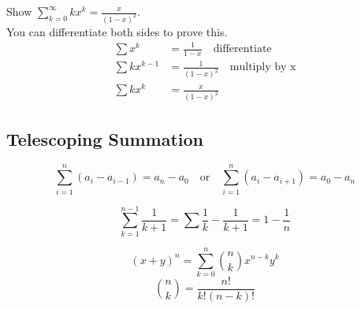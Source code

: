 \begin{example}
    [Summation]
    Show $ \sum_{k=0}^\infty kx^k = \frac{x}{(1-x)^2} $. \\
    You can differentiate both sides to prove this.
    \begin{align*}
        \sum x^k      & = \frac{1}{1-x} \quad \text{differentiate}     \\
        \sum kx^{k-1} & = \frac{1}{(1-x)^2} \quad \text{multiply by x} \\
        \sum kx^k     & = \frac{x}{(1-x)^2}
    \end{align*}

\end{example}

\subsection*{Telescoping Summation}
\begin{definition}
    \[
        \sum_{i=1}^{n} (a_i - a_{i-1}) = a_n - a_0 \quad \text{or} \quad \sum_{i=1}^{n} (a_i - a_{i+1}) = a_0 - a_n
    \]
\end{definition}

\begin{example}
    \[
        \sum_{k=1}^{n-1} \frac{1}{k+1} = \sum \frac{1}{k} - \frac{1}{k+1} = 1 - \frac{1}{n}
    \]
\end{example}

\begin{definition}
    \[
        (x + y)^n = \sum_{k=0}^{n} \binom{n}{k} x^{n-k} y^k
    \]
    \[
        \binom{n}{k} = \frac{n!}{k!(n-k)!}
    \]
\end{definition}